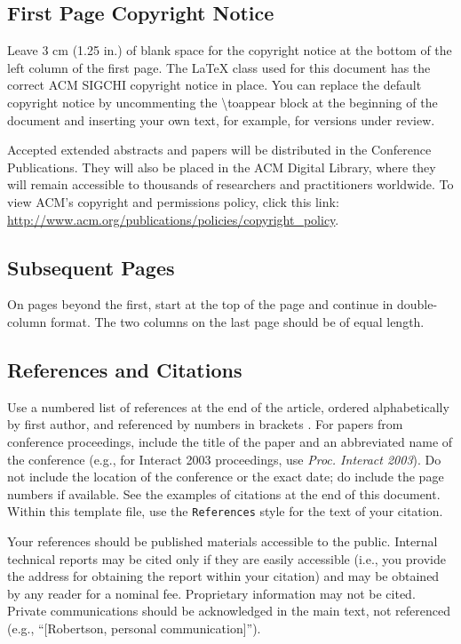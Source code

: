 \documentclass{sigchi}
\begin{document}
\subsection{First Page Copyright Notice}

Leave 3 cm (1.25 in.) of blank space for the copyright notice at the
bottom of the left column of the first page. The LaTeX class used
for this document has the correct ACM SIGCHI copyright notice in place. 
You can replace the default copyright notice by uncommenting
the {\textbackslash}toappear block at the beginning of the document
and inserting your own text, for example, for versions under review.

Accepted extended abstracts and papers will be distributed in the 
Conference Publications. They will also be placed in the 
ACM Digital Library, where they will remain accessible to 
thousands of researchers and practitioners worldwide. 
To view ACM’s copyright and permissions policy, click this link: 
\url{http://www.acm.org/publications/policies/copyright_policy}. 

\subsection{Subsequent Pages}

On pages beyond the first, start at the top of the page and continue
in double-column format.  The two columns on the last page should be
of equal length.

\subsection{References and Citations}

Use a numbered list of references at the end of the article, ordered
alphabetically by first author, and referenced by numbers in brackets
\cite{ethics,
  Klemmer:2002:WSC:503376.503378,
  Mather:2000:MUT,
  Zellweger:2001:FAO:504216.504224}. For
papers from conference proceedings, include the title of the paper and
an abbreviated name of the conference (e.g., for Interact 2003
proceedings, use \textit{Proc. Interact 2003}). Do not include the
location of the conference or the exact date; do include the page
numbers if available. See the examples of citations at the end of this
document. Within this template file, use the \texttt{References} style
for the text of your citation.

Your references should be published materials accessible to the
public.  Internal technical reports may be cited only if they are
easily accessible (i.e., you provide the address for obtaining the
report within your citation) and may be obtained by any reader for a
nominal fee.  Proprietary information may not be cited. Private
communications should be acknowledged in the main text, not referenced
(e.g., ``[Robertson, personal communication]'').
\end{document}
